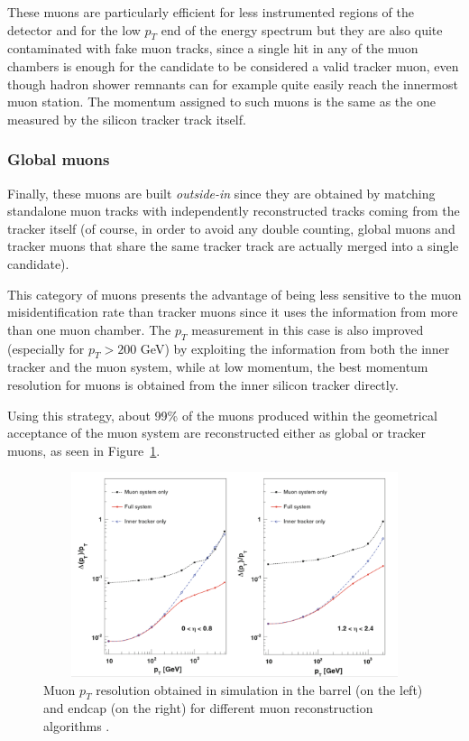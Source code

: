 \documentclass[a4paper, 10pt, openright]{report}
\begin{document}
These muons are particularly efficient for less instrumented regions of the detector and for the low $p_T$ end of the energy spectrum but they are also quite contaminated with fake muon tracks, since a single hit in any of the muon chambers is enough for the candidate to be considered a valid tracker muon, even though hadron shower remnants can for example quite easily reach the innermost muon station. The momentum assigned to such muons is the same as the one measured by the silicon tracker track itself.

\subsubsection*{Global muons}
Finally, these muons are built \textit{outside-in} since they are obtained by matching standalone muon tracks with independently reconstructed tracks coming from the tracker itself (of course, in order to avoid any double counting, global muons and tracker muons that share the same tracker track are actually merged into a single candidate). 

This category of muons presents the advantage of being less sensitive to the muon misidentification rate than tracker muons since it uses the information from more than one muon chamber. The $p_T$ measurement in this case is also improved (especially for $p_T > 200$ GeV) by exploiting the information from both the inner tracker and the muon system, while at low momentum, the best momentum resolution for muons is obtained from the inner silicon tracker directly.

Using this strategy, about 99\% of the muons produced within the geometrical acceptance of the muon system are reconstructed either as global or tracker muons, as seen in Figure~\ref{fig:MuonEff2}.

\begin{figure}[htbp]
\begin{center}
\includegraphics[width=13cm, height=6cm]{figs/MuonEff.png}
\caption{Muon $p_T$ resolution obtained in simulation in the barrel (on the left) and endcap (on the right) for different muon reconstruction algorithms \cite{Quarkonium}.}
\label{fig:MuonEff2}
\end{center}
\end{figure}
\end{document}
